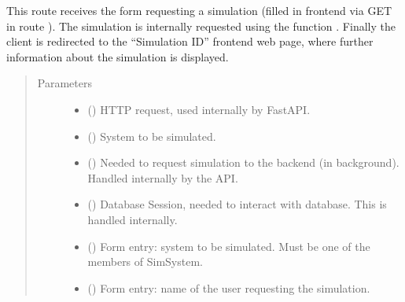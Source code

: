 \documentclass[a4paper,landscape,10pt,english]{sphinxmanual}
\begin{document}
\begin{fulllineitems}
This route receives the form requesting a simulation (filled in
frontend via GET in route ). The simulation is
internally requested using the function
{\hyperref[\detokenize{code_docs/simulation_API.controller:simulation_API.controller.tasks._api_simulation_request}]{}}.
Finally the client is redirected to the “Simulation ID” frontend web
page, where further information about the simulation is displayed.
\begin{quote}\begin{description}
\item[{Parameters}] \leavevmode\begin{itemize}
\item {} 
 () \textendash{} HTTP request, used internally by FastAPI.

\item {} 
 ({\hyperref[\detokenize{code_docs/simulation_API.controller:simulation_API.controller.schemas.SimSystem}]{}}) \textendash{} System to be simulated.

\item {} 
 () \textendash{} Needed to request simulation to the backend (in background). Handled
internally by the API.

\item {} 
 () \textendash{} Database Session, needed to interact with database. This is handled
internally.

\item {} 
 ({\hyperref[\detokenize{code_docs/simulation_API.controller:simulation_API.controller.schemas.SimSystem}]{}}) \textendash{} Form entry: system to be simulated. Must be one of the members of
SimSystem.

\item {} 
 () \textendash{} Form entry: name of the user requesting the simulation.


\end{itemize}
\end{description}
\end{quote}
\end{fulllineitems}
\end{document}
